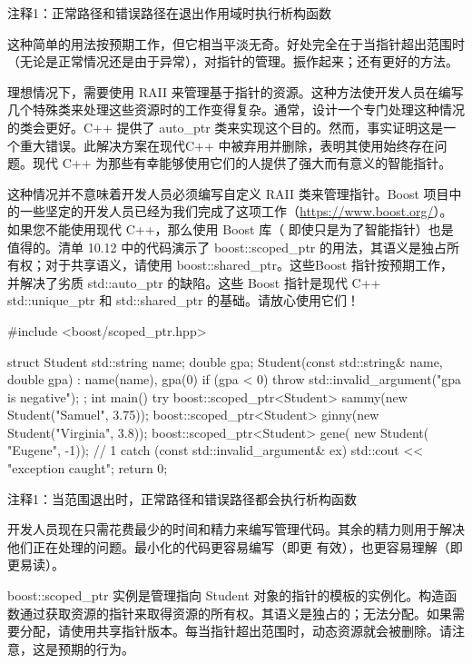 {\footnotesize
注释1：正常路径和错误路径在退出作用域时执行析构函数
}

这种简单的用法按预期工作，但它相当平淡无奇。好处完全在于当指针超出范围时（无论是正常情况还是由于异常），对指针的管理。振作起来；还有更好的方法。


理想情况下，需要使用 RAII 来管理基于指针的资源。这种方法使开发人员在编写几个特殊类来处理这些资源时的工作变得复杂。通常，设计一个专门处理这种情况的类会更好。C++ 提供了 auto\_ptr 类来实现这个目的。然而，事实证明这是一个重大错误。此解决方案在现代C++ 中被弃用并删除，表明其使用始终存在问题。现代 C++ 为那些有幸能够使用它们的人提供了强大而有意义的智能指针。

这种情况并不意味着开发人员必须编写自定义 RAII 类来管理指针。Boost 项目中的一些坚定的开发人员已经为我们完成了这项工作（\url{https://www.boost.org/}）。如果您不能使用现代 C++，那么使用 Boost 库（ 即使只是为了智能指针）也是值得的。清单 10.12 中的代码演示了 boost::scoped\_ptr 的用法，其语义是独占所有权；对于共享语义，请使用 boost::shared\_ptr。这些Boost 指针按预期工作，并解决了劣质 std::auto\_ptr 的缺陷。这些 Boost 指针是现代 C++ std::unique\_ptr 和 std::shared\_ptr 的基础。请放心使用它们！


\begin{cpp}
#include <boost/scoped_ptr.hpp>

struct Student {
  std::string name;
  double gpa;
  Student(const std::string& name, double gpa) : name(name), gpa(0) {
    if (gpa < 0)
      throw std::invalid_argument("gpa is negative");
  }
};
int main() {
  try {
    boost::scoped_ptr<Student> sammy(new Student("Samuel", 3.75));
    boost::scoped_ptr<Student> ginny(new Student("Virginia", 3.8));
    boost::scoped_ptr<Student> gene(
    new Student( "Eugene", -1)); // 1
  } catch (const std::invalid_argument& ex) {
    std::cout << "exception caught\n";
  }
  return 0;
}
\end{cpp}

{\footnotesize
注释1：当范围退出时，正常路径和错误路径都会执行析构函数
}

开发人员现在只需花费最少的时间和精力来编写管理代码。其余的精力则用于解决他们正在处理的问题。最小化的代码更容易编写（即更 有效），也更容易理解（即更易读）。

boost::scoped\_ptr 实例是管理指向 Student 对象的指针的模板的实例化。构造函数通过获取资源的指针来取得资源的所有权。其语义是独占的；无法分配。如果需要分配，请使用共享指针版本。每当指针超出范围时，动态资源就会被删除。请注意，这是预期的行为。

